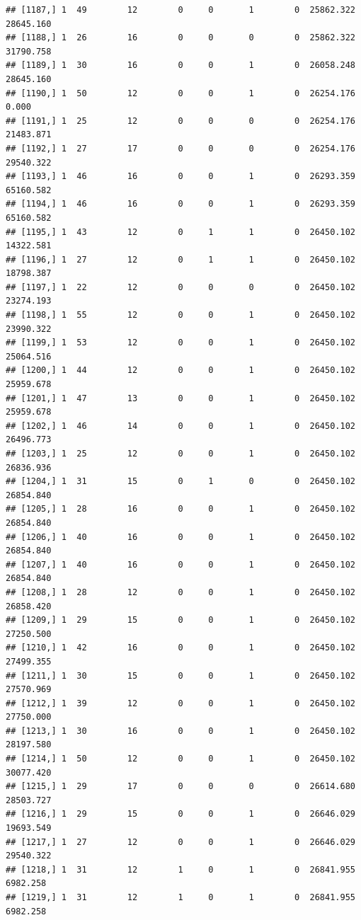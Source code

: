 \documentclass[
]{article}
\begin{document}
\begin{verbatim}
## [1187,] 1  49        12        0     0       1        0  25862.322  28645.160
## [1188,] 1  26        16        0     0       0        0  25862.322  31790.758
## [1189,] 1  30        16        0     0       1        0  26058.248  28645.160
## [1190,] 1  50        12        0     0       1        0  26254.176      0.000
## [1191,] 1  25        12        0     0       0        0  26254.176  21483.871
## [1192,] 1  27        17        0     0       0        0  26254.176  29540.322
## [1193,] 1  46        16        0     0       1        0  26293.359  65160.582
## [1194,] 1  46        16        0     0       1        0  26293.359  65160.582
## [1195,] 1  43        12        0     1       1        0  26450.102  14322.581
## [1196,] 1  27        12        0     1       1        0  26450.102  18798.387
## [1197,] 1  22        12        0     0       0        0  26450.102  23274.193
## [1198,] 1  55        12        0     0       1        0  26450.102  23990.322
## [1199,] 1  53        12        0     0       1        0  26450.102  25064.516
## [1200,] 1  44        12        0     0       1        0  26450.102  25959.678
## [1201,] 1  47        13        0     0       1        0  26450.102  25959.678
## [1202,] 1  46        14        0     0       1        0  26450.102  26496.773
## [1203,] 1  25        12        0     0       1        0  26450.102  26836.936
## [1204,] 1  31        15        0     1       0        0  26450.102  26854.840
## [1205,] 1  28        16        0     0       1        0  26450.102  26854.840
## [1206,] 1  40        16        0     0       1        0  26450.102  26854.840
## [1207,] 1  40        16        0     0       1        0  26450.102  26854.840
## [1208,] 1  28        12        0     0       1        0  26450.102  26858.420
## [1209,] 1  29        15        0     0       1        0  26450.102  27250.500
## [1210,] 1  42        16        0     0       1        0  26450.102  27499.355
## [1211,] 1  30        15        0     0       1        0  26450.102  27570.969
## [1212,] 1  39        12        0     0       1        0  26450.102  27750.000
## [1213,] 1  30        16        0     0       1        0  26450.102  28197.580
## [1214,] 1  50        12        0     0       1        0  26450.102  30077.420
## [1215,] 1  29        17        0     0       0        0  26614.680  28503.727
## [1216,] 1  29        15        0     0       1        0  26646.029  19693.549
## [1217,] 1  27        12        0     0       1        0  26646.029  29540.322
## [1218,] 1  31        12        1     0       1        0  26841.955   6982.258
## [1219,] 1  31        12        1     0       1        0  26841.955   6982.258

\end{verbatim}
\end{document}
